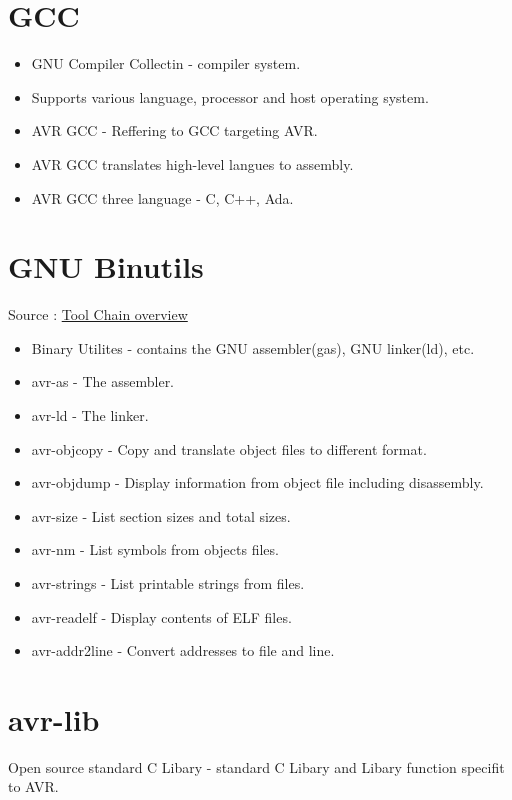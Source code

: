 
% 

\section{GCC\texorpdfstring{\cite{toolChain}}{}}
\begin{itemize}
    \item GNU Compiler Collectin - compiler system.
    \item Supports various language, processor and host operating system.
    \item AVR GCC - Reffering to GCC targeting AVR.
    \item AVR GCC translates high-level langues to assembly.
    \item AVR GCC three language - C, C++, Ada.
\end{itemize}

\section{GNU Binutils\texorpdfstring{\cite{toolChain}}{}} 
Source : \href{https://www.nongnu.org/avr-libc/user-manual/overview.html}{Tool Chain overview}
\begin{itemize}
    \item Binary Utilites - contains the GNU assembler(gas), GNU linker(ld), etc.
    \item avr-as - The assembler.
    \item avr-ld - The linker.
    \item avr-objcopy - Copy and translate object files to different format.
    \item avr-objdump - Display information from object file including disassembly.
    \item avr-size - List section sizes and total sizes.
    \item avr-nm - List symbols from objects files.
    \item avr-strings - List printable strings from files.
    \item avr-readelf - Display contents of ELF files.
    \item avr-addr2line - Convert addresses to file and line.
\end{itemize}

\section{avr-lib\texorpdfstring{\cite{toolChain}}{}}
\quad Open source standard C Libary - standard C Libary and Libary function specifit to AVR.



